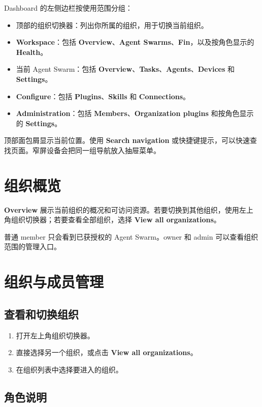 \documentclass[UTF8,a4paper,11pt]{ctexart}
\begin{document}
Dashboard 的左侧边栏按使用范围分组：

\begin{itemize}
  \item 顶部的组织切换器：列出你所属的组织，用于切换当前组织。
  \item \textbf{Workspace}：包括 \textbf{Overview}、\textbf{Agent Swarms}、\textbf{Fin}，以及按角色显示的 \textbf{Health}。
  \item 当前 Agent Swarm：包括 \textbf{Overview}、\textbf{Tasks}、\textbf{Agents}、\textbf{Devices} 和 \textbf{Settings}。
  \item \textbf{Configure}：包括 \textbf{Plugins}、\textbf{Skills} 和 \textbf{Connections}。
  \item \textbf{Administration}：包括 \textbf{Members}、\textbf{Organization plugins} 和按角色显示的 \textbf{Settings}。
\end{itemize}

顶部面包屑显示当前位置。使用 \textbf{Search navigation} 或快捷键提示，可以快速查找页面。窄屏设备会把同一组导航放入抽屉菜单。

\section{组织概览}

\textbf{Overview} 展示当前组织的概况和可访问资源。若要切换到其他组织，使用左上角组织切换器；若要查看全部组织，选择 \textbf{View all organizations}。

普通 member 只会看到已获授权的 Agent Swarm。owner 和 admin 可以查看组织范围的管理入口。

\section{组织与成员管理}

\subsection{查看和切换组织}

\begin{enumerate}
  \item 打开左上角组织切换器。
  \item 直接选择另一个组织，或点击 \textbf{View all organizations}。
  \item 在组织列表中选择要进入的组织。
\end{enumerate}

\subsection{角色说明}
\end{document}
